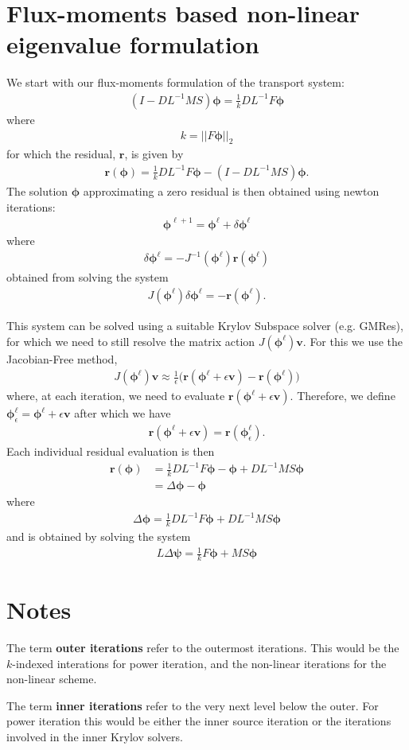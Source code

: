 \documentclass[11pt,letterpaper,notitlepage]{article}
\newcommand{\beqn}{\begin{equation}
		\begin{aligned}}
\newcommand{\eeqn}{\end{aligned}
\end{equation}}
\numberwithin{equation}{section}
\newcommand{\Linv}{L^{-1}}
\newcommand{\bphi}{\boldsymbol{\phi}}
\newcommand{\bpsi}{\boldsymbol{\psi}}
\newcommand{\br}{\mathbf{r}}
\begin{document}
\newpage
{}
\section{Flux-moments based non-linear eigenvalue formulation}
We start with our flux-moments formulation of the transport system:
\beqn 
(I-D\Linv MS) \bphi = \frac{1}{k} D\Linv F\bphi
\eeqn 
where 
\beqn 
k = ||F\bphi ||_2
\eeqn 
for which the residual, $\br$, is given by
\beqn 
\br(\bphi) = \frac{1}{k} D\Linv F\bphi - (I-D\Linv MS) \bphi.
\eeqn 
The solution $\bphi$ approximating a zero residual is then obtained using newton iterations:
\beqn 
\bphi^{\ell+1} = \bphi^{\ell}  + \delta \bphi^{\ell}
\eeqn
where
\beqn
\delta \bphi^{\ell} = - J^{-1}(\bphi^{\ell}) \br(\bphi^{\ell})
\eeqn 
obtained from solving the system
\beqn 
J(\bphi^{\ell}) \delta \bphi^{\ell} = -\br(\bphi^{\ell}).
\eeqn 

This system can be solved using a suitable Krylov Subspace solver (e.g. GMRes), for which we need to still resolve the matrix action $J(\bphi^{\ell})\mathbf{v}$. For this we use the Jacobian-Free method,
\beqn 
J(\bphi^{\ell})\mathbf{v} \approx \frac{1}{\epsilon} \biggr(\br(\bphi^\ell + \epsilon \mathbf{v}) - \br(\bphi^\ell)\biggr)
\eeqn 
where, at each iteration, we need to evaluate $\br(\bphi^\ell + \epsilon \mathbf{v})$. Therefore, we define $\bphi_\epsilon^\ell = \bphi^\ell + \epsilon \mathbf{v}$ after which we have
\beqn 
\br(\bphi^\ell + \epsilon \mathbf{v}) = \br(\bphi_\epsilon^\ell).
\eeqn 
Each individual residual evaluation is then 
\beqn 
\br(\bphi) 
&= \frac{1}{k} D\Linv F \bphi - \bphi + D\Linv MS \bphi \\
&= \Delta \bphi - \bphi
\eeqn 
where
\beqn 
\Delta \bphi = \frac{1}{k} D\Linv F \bphi + D\Linv MS \bphi
\eeqn 
and is obtained by solving the system
\beqn 
L \Delta \bpsi  =  \frac{1}{k} F \bphi + MS \bphi
\eeqn 



\newpage
\section{Notes}
The term \textbf{outer iterations} refer to the outermost iterations. This would be the $k$-indexed interations for power iteration, and the non-linear iterations for the non-linear scheme.

The term \textbf{inner iterations} refer to the very next level below the outer. For power iteration this would be either the inner source iteration or the iterations involved in the inner Krylov solvers. 
\end{document}
